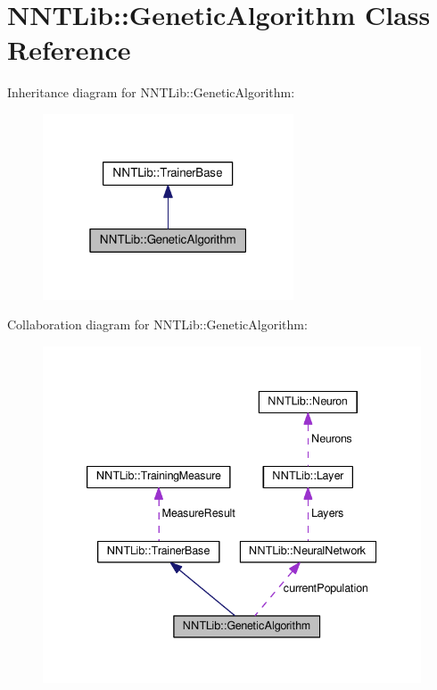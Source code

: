 \hypertarget{class_n_n_t_lib_1_1_genetic_algorithm}{}\section{N\+N\+T\+Lib\+:\+:Genetic\+Algorithm Class Reference}
\label{class_n_n_t_lib_1_1_genetic_algorithm}


Inheritance diagram for N\+N\+T\+Lib\+:\+:Genetic\+Algorithm\+:\nopagebreak
\begin{figure}[H]
\begin{center}
\leavevmode
\includegraphics[width=211pt]{class_n_n_t_lib_1_1_genetic_algorithm__inherit__graph}
\end{center}
\end{figure}


Collaboration diagram for N\+N\+T\+Lib\+:\+:Genetic\+Algorithm\+:\nopagebreak
\begin{figure}[H]
\begin{center}
\leavevmode
\includegraphics[width=339pt]{class_n_n_t_lib_1_1_genetic_algorithm__coll__graph}
\end{center}
\end{figure}
